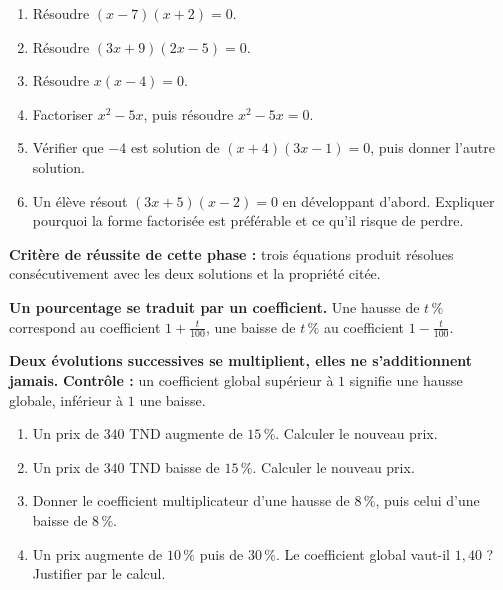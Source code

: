 \documentclass[10pt,a4paper]{article}
\begin{document}
\begin{enumerate}
\needspace{18mm}
\item Résoudre $(x - 7)(x + 2) = 0$.
\needspace{18mm}
\item Résoudre $(3x + 9)(2x - 5) = 0$.
\needspace{18mm}
\item Résoudre $x(x - 4) = 0$.
\needspace{18mm}
\item Factoriser $x^2 - 5x$, puis résoudre $x^2 - 5x = 0$.
\needspace{18mm}
\item Vérifier que $-4$ est solution de $(x + 4)(3x - 1) = 0$, puis donner l'autre solution.
\needspace{18mm}
\item Un élève résout $(3x + 5)(x - 2) = 0$ en développant d'abord. Expliquer pourquoi la forme factorisée est préférable et ce qu'il risque de perdre.
\end{enumerate}
\begin{successbox}\textbf{Critère de réussite de cette phase :} trois équations produit résolues consécutivement avec les deux solutions et la propriété citée.\end{successbox}
\certline
\needspace{62mm}\par\vspace{3mm}
\begin{methodbox}
\textbf{Un pourcentage se traduit par un coefficient.} Une hausse de $t\,\%$ correspond au coefficient
$1 + \frac{t}{100}$, une baisse de $t\,\%$ au coefficient $1 - \frac{t}{100}$.
\par\smallskip
\textbf{Deux évolutions successives se multiplient, elles ne s'additionnent jamais.}
\textbf{Contrôle :} un coefficient global supérieur à $1$ signifie une hausse globale, inférieur à $1$ une baisse.
\end{methodbox}
\begin{enumerate}
\needspace{18mm}
\item Un prix de $340$ TND augmente de $15\,\%$. Calculer le nouveau prix.
\needspace{18mm}
\item Un prix de $340$ TND baisse de $15\,\%$. Calculer le nouveau prix.
\needspace{18mm}
\item Donner le coefficient multiplicateur d'une hausse de $8\,\%$, puis celui d'une baisse de $8\,\%$.
\needspace{18mm}
\item Un prix augmente de $10\,\%$ puis de $30\,\%$. Le coefficient global vaut-il $1{,}40$ ? Justifier par le calcul.
\end{enumerate}
\end{document}
